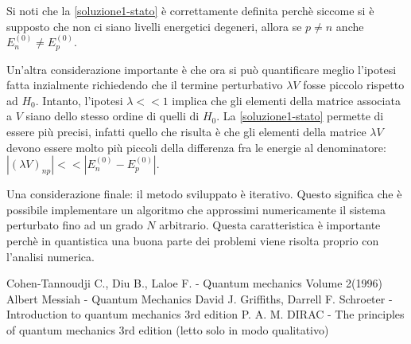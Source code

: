 \documentclass[a4paper, 10pt]{article}
\newcommand{\reff}[1]{\mbox{\ref{#1}}}
\begin{document}
Si noti che la \reff{soluzione1-stato} è correttamente definita perchè siccome si è supposto che non ci siano livelli energetici degeneri, allora se $p \ne n$ anche $E_n^{(0)} \ne E_p^{(0)}$.

Un'altra considerazione importante è che ora si può quantificare meglio l'ipotesi fatta inzialmente richiedendo che il termine perturbativo $\lambda V$ fosse piccolo rispetto ad $H_0$. Intanto, l'ipotesi $\lambda << 1$ implica che gli elementi della matrice associata a $V$ siano dello stesso ordine di quelli di $H_0$. La \reff{soluzione1-stato} permette di essere più precisi, infatti quello che risulta è che gli elementi della matrice $\lambda V$ devono essere molto più piccoli della differenza fra le energie al denominatore: $|(\lambda V)_{np}| << |E_n^{(0)} - E_p^{(0)}|$.

Una considerazione finale: il metodo sviluppato è iterativo. Questo significa che è possibile implementare un algoritmo che approssimi numericamente il sistema perturbato fino ad un grado $N$ arbitrario. Questa caratteristica è importante perchè in quantistica una buona parte dei problemi viene risolta proprio con l'analisi numerica. 

\begin{thebibliography}{}
	 Cohen-Tannoudji C., Diu B., Laloe F. - Quantum mechanics Volume 2(1996)
	 Albert Messiah - Quantum Mechanics
	 David J. Griffiths, Darrell F. Schroeter - Introduction to quantum mechanics 3rd edition
	 P. A. M. DIRAC - The principles of quantum mechanics 3rd edition (letto solo in modo qualitativo)	  
\end{thebibliography}
\end{document}
